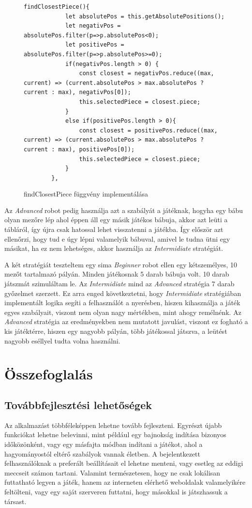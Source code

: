 \documentclass[a4paper,twoside]{article}
\begin{document}
\begin{figure}
	\caption{findClosestPiece függvény implementálása}
	\begin{minipage}{\textwidth}
		\begin{lstlisting}[style=javascriptStyle]
		findClosestPiece(){
			let absolutePos = this.getAbsolutePositions();
			let negativPos = absolutePos.filter(p=>p.absolutePos<0);
			let positivePos = absolutePos.filter(p=>p.absolutePos>=0);
			if(negativPos.length > 0) {
				const closest = negativPos.reduce((max, current) => (current.absolutePos > max.absolutePos ? current : max), negativPos[0]);
				this.selectedPiece = closest.piece;
			}
			else if(positivePos.length > 0){
				const closest = positivePos.reduce((max, current) => (current.absolutePos > max.absolutePos ? current : max), positivePos[0]);
				this.selectedPiece = closest.piece;
			}
		},
		\end{lstlisting}
	\end{minipage}
	
	\label{findClos}
\end{figure}
\FloatBarrier
 Az \textit{Advanced} robot pedig használja azt a szabályát a játéknak, hogyha egy bábu olyan mezőre lép ahol éppen áll egy másik játékos bábuja, akkor azt leüti a tábláról, így újra csak hatossal lehet visszatenni a játékba. Így először azt ellenőrzi, hogy tud e úgy lépni valamelyik bábuval, amivel le tudna ütni egy másikat, ha ez nem lehetséges, akkor használja az \textit{Intermidiate} stratégiát.
 
A két stratégiát teszteltem egy sima \textit{Beginner} robot ellen egy kétszemélyes, 10 mezőt tartalmazó pályán. Minden játékosnak 5 darab bábuja volt. 10 darab játszmát szimuláltam le. Az \textit{Intermidiate} mind az \textit{Advanced} stratégia 7 darab győzelmet szerzett. Ez arra enged következtetni, hogy \textit{Intermidiate} stratégiában implementált logika segíti a felhasználót a nyerésben, hiszen kihasználja a játék egyes szabályait, viszont nem olyan nagy mértékben, mint ahogy remélnénk. Az \textit{Advanced} stratégia az eredményekben nem mutatott javulást, viszont ez fogható a kis játéktérre, hiszen egy nagyobb pályán, több játékossal játszva, a leütést nagyobb eséllyel tudta volna használni. 
\section{Összefoglalás}
\subsection{Továbbfejlesztési lehetőségek}
Az alkalmazást többféleképpen lehetne tovább fejleszteni. Egyrészt újabb funkciókat lehetne belevinni, mint például egy bajnokság indítása bizonyos időközönként, vagy egy másfajta módban indítani a játékot, ahol a hagyományostól eltérő szabályok vannak életben. A bejelentkezett felhasználóknak a preferált beállításait el lehetne menteni, vagy esetleg az eddigi meccseit számon tartani. Valamint természetesen, hogy ne csak lokálisan futtatható legyen a játék, hanem az interneten elérhető weboldalak valamelyikére feltölteni, vagy egy saját szerveren futtatni, hogy másokkal is játszhassuk a társast. 
\end{document}
